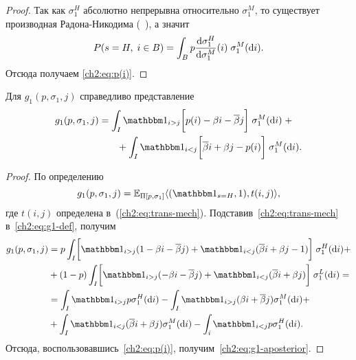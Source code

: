{\begin{proof}

  Так как $\sigma^H_1$ абсолютно непрерывна относительно $\sigma^M_1$, то существует производная Радона-Никодима (\seename~\cite{kolmogorov-fomin}), а значит
  \begin{equation*}
    P(s = H, \; i \in B) =
    \int_B p \frac{\mathop{}\!\mathrm{d} \sigma^H_1}{\mathop{}\!\mathrm{d} \sigma^M_1}(i) \; \sigma^M_1(\mathop{}\!\mathrm{d} i).
  \end{equation*}
  Отсюда получаем \eqref{ch2:eq:p(i)}.
\end{proof}

\begin{proposition}
  Для $g_1(p, \sigma_1, j)$ справедливо представление
  \begin{equation}\label{ch2:eq:g1-aposterior}
    \begin{multlined}
      g_1(p, \sigma_1, j) = \int_I \Ind{i > j} \biggl[ p(i) - \Co i -
      \DCo j
      \biggr] \; \sigma^M_1(\di i) \; + \\
      + \int_I \Ind{i < j} \biggl[ \DCo i + \Co j - p(i) \biggr] \;
      \sigma^M_1(\di i).
    \end{multlined}
  \end{equation}
\end{proposition}
\begin{proof}
  По определению
  \begin{equation}\label{ch2:eq:g1-def}
    g_1(p, \sigma_1, j) = \E_{\Pi[p, \sigma_1]} \langle
    (\Ind{s = H}, 1), t(i, j)
    \rangle,
  \end{equation}
  где $t(i, j)$ определена в~(\ref{ch2:eq:trans-mech}).
  Подставив~\eqref{ch2:eq:trans-mech} в~\eqref{ch2:eq:g1-def}, получим
  \begin{align*}
    g_1(p, \sigma_1, j) 
    &= p \int_I \biggl[ \Ind{i > j}(1 - \Co i - \DCo j) + \Ind{i < j} (\DCo i + \Co j - 1) \biggr] \; \sigma^H_1(\di i) + \\
    &+ (1-p) \int_I \biggl[
      \Ind{i > j} (- \Co i - \DCo j) + \Ind{i < j}(\DCo i + \Co j) 
    \biggr]
    \; \sigma^L_1(\di i) = \\
    &= \int_I \Ind{i > j} p \sigma^H_1(\di i) -
    \int_I \Ind{i > j} (\Co i + \DCo j) \sigma^M_1 (\di i) + \\
    &+ \int_I \Ind{i < j} (\DCo i + \Co j) \sigma^M_1 (\di i) -
    \int_i \Ind{i < j} p \sigma^H_1(\di i).
  \end{align*}
  Отсюда, воспользовавшись~\eqref{ch2:eq:p(i)}, получим~\eqref{ch2:eq:g1-aposterior}.
\end{proof}

}
